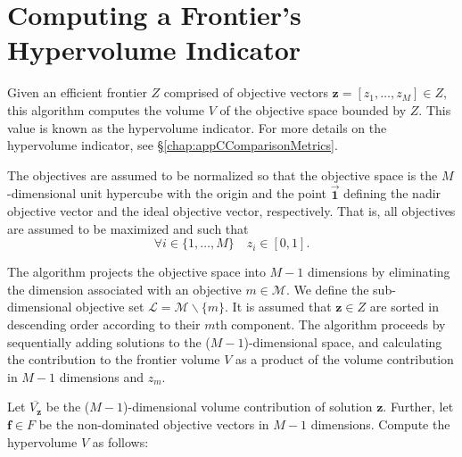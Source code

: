  
\chapter{Computing a Frontier's Hypervolume Indicator}
\label{chap:appAHypervolumeAlgo}
Given an efficient frontier $Z$ comprised of objective vectors $\mathbf{z} = [z_1,\ldots,z_M] \in Z$, this algorithm computes the volume $V$ of the objective space bounded by $Z$. This value is known as the hypervolume indicator. For more details on the hypervolume indicator, see \S \ref{chap:appCComparisonMetrics}.

The objectives are assumed to be normalized so that the objective space is the $M$-dimensional unit hypercube with the origin and the point $\vec{\mathbf{1}}$ defining the nadir objective vector and the ideal objective vector, respectively. That is, all objectives are assumed to be maximized and such that
$$ \forall i \in \{1,\ldots,M\} \quad z_i \in [0,1].$$

The algorithm projects the objective space into $M-1$ dimensions by eliminating the dimension associated with an objective $m \in \mathcal{M}$. We define the sub-dimensional objective set $\mathcal{L} = \mathcal{M} \backslash \{m\}$. It is assumed that $\mathbf{z} \in Z$ are sorted in descending order according to their $m$th component. The algorithm proceeds by sequentially adding solutions to the ($M-1$)-dimensional space, and calculating the contribution to the frontier volume $V$ as a product of the volume contribution in $M-1$ dimensions and $z_m$.

Let $\overbar{V_\mathbf{z}}$ be the ($M-1$)-dimensional volume contribution of solution $\mathbf{z}$. Further, let
$\mathbf{f} \in F$ be the non-dominated objective vectors in $M-1$ dimensions.
Compute the hypervolume $V$ as follows:

